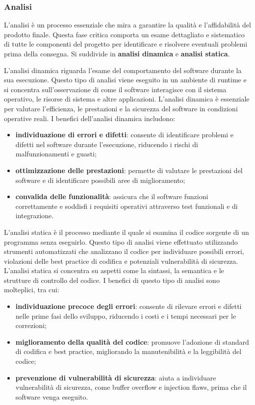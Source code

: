 \subsubsection{Analisi}
L'analisi è un processo essenziale che mira a garantire la qualità e l'affidabilità del prodotto finale. Questa fase critica comporta un esame dettagliato e sistematico di tutte le componenti del progetto per identificare e risolvere eventuali problemi prima della consegna. Si suddivide in \textbf{analisi dinamica} e \textbf{analisi statica}.

L'analisi dinamica riguarda l'esame del comportamento del software durante la sua esecuzione. Questo tipo di analisi viene eseguito in un ambiente di runtime e si concentra sull'osservazione di come il software interagisce con il sistema operativo, le risorse di sistema e altre applicazioni. L'analisi dinamica è essenziale per valutare l'efficienza, le prestazioni e la sicurezza del software in condizioni operative reali.
I benefici dell'analisi dinamica includono:
\begin{itemize}
	\item \textbf{individuazione di errori e difetti}: consente di identificare problemi e difetti nel software durante l'esecuzione, riducendo i rischi di malfunzionamenti e guasti;
	\item \textbf{ottimizzazione delle prestazioni}: permette di valutare le prestazioni del software e di identificare possibili aree di miglioramento;
	\item \textbf{convalida delle funzionalità}: assicura che il software funzioni correttamente e soddisfi i requisiti operativi attraverso test funzionali e di integrazione.
\end{itemize}
L'analisi statica è il processo mediante il quale si esamina il codice sorgente di un programma senza eseguirlo. Questo tipo di analisi viene effettuato utilizzando strumenti automatizzati che analizzano il codice per individuare possibili errori, violazioni delle best practice di codifica e potenziali vulnerabilità di sicurezza. L'analisi statica si concentra su aspetti come la sintassi, la semantica e le strutture di controllo del codice. I benefici di questo tipo di analisi sono molteplici, tra cui:
\begin{itemize}
	\item \textbf{individuazione precoce degli errori}: consente di rilevare errori e difetti nelle prime fasi dello sviluppo, riducendo i costi e i tempi necessari per le correzioni;
	\item \textbf{miglioramento della qualità del codice}: promuove l'adozione di standard di codifica e best practice, migliorando la manutenibilità e la leggibilità del codice;
	\item \textbf{prevenzione di vulnerabilità di sicurezza}: aiuta a individuare vulnerabilità di sicurezza, come buffer overflow e injection flaws, prima che il software venga eseguito.
\end{itemize}

